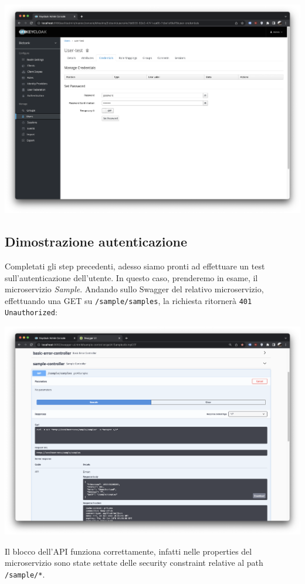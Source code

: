 \documentclass{article}
\begin{document}
\begin{center}
    \includegraphics[width=0.80\linewidth]{keycloak_14.png}
\end{center}

\subsection{Dimostrazione autenticazione}

Completati gli step precedenti, adesso siamo pronti ad effettuare un test sull'autenticazione dell'utente.
In questo caso, prenderemo in esame, il microservizio \textit{Sample}. Andando sullo Swagger del relativo microservizio, effettuando una GET su \texttt{/sample/samples}, la richiesta ritornerà \texttt{401 Unauthorized}:

\begin{center}
    \includegraphics[width=0.80\linewidth]{keycloak_15.png}
\end{center}

Il blocco dell'API funziona correttamente, infatti nelle properties del microservizio sono state settate delle security constraint relative al path \texttt{/sample/*}.
\end{document}
